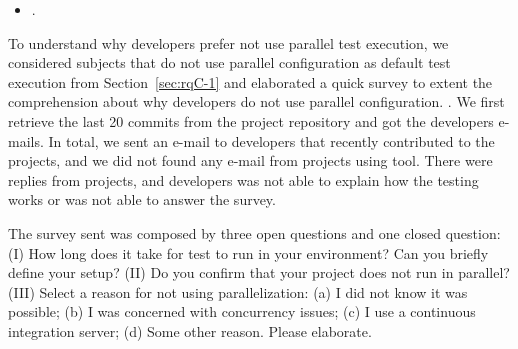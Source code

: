 \begin{itemize}
	\item \numRQE{}. \textbf{\RQE{}}
\end{itemize}

To understand why developers prefer not use parallel test execution,
we considered \numNonParallel{} subjects that do not use parallel
configuration as default test execution from Section~\ref{sec:rqC-1} and elaborated a
quick survey to extent the comprehension about why developers do not
use parallel configuration. .
We first retrieve the last 20 commits from the project repository and
got the developers e-mails. In total, we sent an e-mail to
\emailsSent{} developers that recently contributed to the 
\numNonParallel{} projects, and we did not found any e-mail from
 projects using  tool.
There were \emailsAnswered{} replies from \emailsProjectsAnswered{}
projects, and \emailsFalseAnswers{} developers was not able to 
explain how the testing works or was not able to answer the survey.

The survey sent was composed by three open questions and one closed
question: (I) How long does it take for test to run in your
environment? Can you briefly define your setup? (II) Do you confirm
that your project does not run in parallel? (III) Select a reason for
not using parallelization: (a) I did not know it was possible; (b) I
was concerned with concurrency issues; (c) I use a continuous
integration server; (d) Some other reason. Please elaborate.



